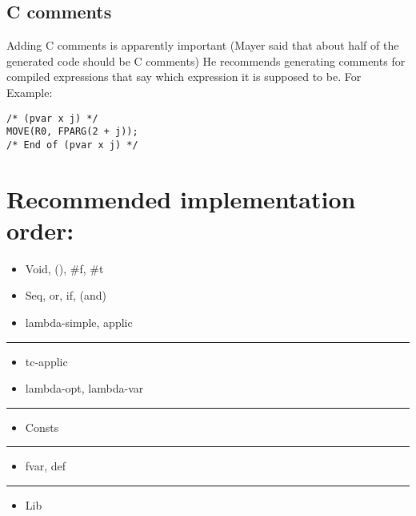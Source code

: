 \documentclass[11pt]{article}
\begin{document}
\subsection{C comments}
\label{sec-2-2}
Adding C comments is apparently important (Mayer said that about half of the generated code should be C comments)
He recommends generating comments for compiled expressions that say which expression it is supposed to be.
For Example:
\begin{verbatim}
/* (pvar x j) */
MOVE(R0, FPARG(2 + j));
/* End of (pvar x j) */
\end{verbatim}

\section{Recommended implementation order:}
\label{sec-3}
\begin{itemize}
\item Void, (), \#f, \#t
\item Seq, or, if, (and)
\item lambda-simple, applic
\end{itemize}

\rule{\linewidth}{0.5pt}
\begin{itemize}
\item tc-applic
\item lambda-opt, lambda-var
\end{itemize}

\rule{\linewidth}{0.5pt}
\begin{itemize}
\item Consts
\end{itemize}

\rule{\linewidth}{0.5pt}
\begin{itemize}
\item fvar, def
\end{itemize}

\rule{\linewidth}{0.5pt}
\begin{itemize}
\item Lib
\end{itemize}
\end{document}
